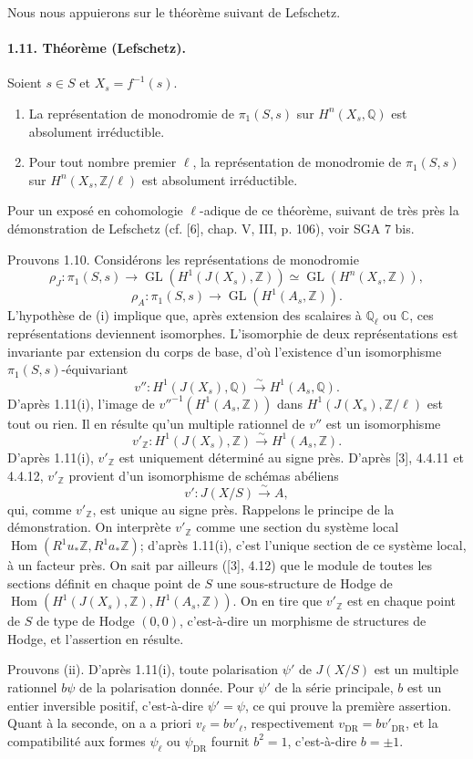 \documentclass[10pt]{article}
\newcommand{\C}{\mathbb C}
\newcommand{\Q}{\mathbb Q}
\newcommand{\Z}{\mathbb Z}
\newcommand{\DR}{\mathrm{DR}}
\newcommand{\GL}{\operatorname{GL}}
\newcommand{\Hom}{\operatorname{Hom}}
\newcommand{\iso}{\xrightarrow{\sim}}
\begin{document}
Nous nous appuierons sur le théorème suivant de Lefschetz.

\paragraph{1.11. Théorème (Lefschetz).} Soient \(s\in S\) et \(X_s=f^{-1}(s)\).
\begin{enumerate}[label=(\roman*)]
\item La représentation de monodromie de \(\pi_1(S,s)\) sur \(H^n(X_s,\Q)\) est absolument irréductible.
\item Pour tout nombre premier \(\ell\), la représentation de monodromie de \(\pi_1(S,s)\) sur \(H^n(X_s,\Z/\ell)\) est absolument irréductible.
\end{enumerate}
Pour un exposé en cohomologie \(\ell\)-adique de ce théorème, suivant de très près la démonstration de Lefschetz (cf. [6], chap. V, III, p. 106), voir SGA 7 bis.

Prouvons 1.10. Considérons les représentations de monodromie
\[
\rho_J:\pi_1(S,s)\to\GL(H^1(J(X_s),\Z))\simeq\GL(H^n(X_s,\Z)),
\]
\[
\rho_A:\pi_1(S,s)\to\GL(H^1(A_s,\Z)).
\]
L'hypothèse de (i) implique que, après extension des scalaires à \(\Q_\ell\) ou \(\C\), ces représentations deviennent isomorphes. L'isomorphie de deux représentations est invariante par extension du corps de base, d'où l'existence d'un isomorphisme \(\pi_1(S,s)\)-équivariant
\[
v'':H^1(J(X_s),\Q)\iso H^1(A_s,\Q).
\]
D'après 1.11(i), l'image de \(v''^{-1}(H^1(A_s,\Z))\) dans \(H^1(J(X_s),\Z/\ell)\) est tout ou rien. Il en résulte qu'un multiple rationnel de \(v''\) est un isomorphisme
\[
v'_\Z:H^1(J(X_s),\Z)\iso H^1(A_s,\Z).
\]
D'après 1.11(i), \(v'_\Z\) est uniquement déterminé au signe près. D'après [3], 4.4.11 et 4.4.12, \(v'_\Z\) provient d'un isomorphisme de schémas abéliens
\[
v':J(X/S)\iso A,
\]
qui, comme \(v'_\Z\), est unique au signe près. Rappelons le principe de la démonstration. On interprète \(v'_\Z\) comme une section du système local \(\Hom(R^1u_*\Z,R^1a_*\Z)\); d'après 1.11(i), c'est l'unique section de ce système local, à un facteur près. On sait par ailleurs ([3], 4.12) que le module de toutes les sections définit en chaque point de \(S\) une sous-structure de Hodge de \(\Hom(H^1(J(X_s),\Z),H^1(A_s,\Z))\). On en tire que \(v'_\Z\) est en chaque point de \(S\) de type de Hodge \((0,0)\), c'est-à-dire un morphisme de structures de Hodge, et l'assertion en résulte.

Prouvons (ii). D'après 1.11(i), toute polarisation \(\psi'\) de \(J(X/S)\) est un multiple rationnel \(b\psi\) de la polarisation donnée. Pour \(\psi'\) de la série principale, \(b\) est un entier inversible positif, c'est-à-dire \(\psi'=\psi\), ce qui prouve la première assertion. Quant à la seconde, on a a priori \(v_\ell=bv'_\ell\), respectivement \(v_{\DR}=bv'_{\DR}\), et la compatibilité aux formes \(\psi_\ell\) ou \(\psi_{\DR}\) fournit \(b^2=1\), c'est-à-dire \(b=\pm1\).
\end{document}
